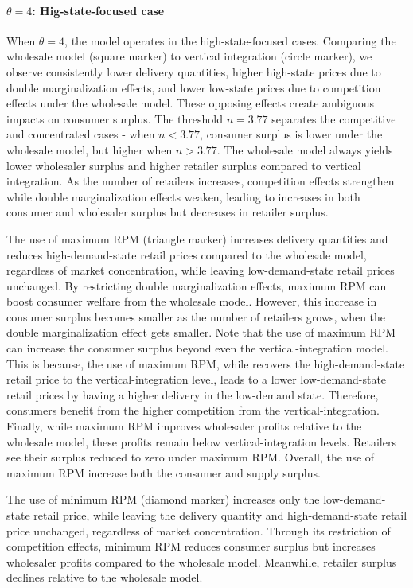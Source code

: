 \documentclass[12pt]{article}
\begin{document}
\paragraph{$\theta = 4$: Hig-state-focused case} When $\theta = 4$, the model operates in the high-state-focused cases. Comparing the wholesale model (square marker) to vertical integration (circle marker), we observe consistently lower delivery quantities, higher high-state prices due to double marginalization effects, and lower low-state prices due to competition effects under the wholesale model. These opposing effects create ambiguous impacts on consumer surplus. The threshold $n = 3.77$ separates the competitive and concentrated cases - when $n < 3.77$, consumer surplus is lower under the wholesale model, but higher when $n > 3.77$. The wholesale model always yields lower wholesaler surplus and higher retailer surplus compared to vertical integration. As the number of retailers increases, competition effects strengthen while double marginalization effects weaken, leading to increases in both consumer and wholesaler surplus but decreases in retailer surplus.

The use of maximum RPM (triangle marker) increases delivery quantities and reduces high-demand-state retail prices compared to the wholesale model, regardless of market concentration, while leaving low-demand-state retail prices unchanged. By restricting double marginalization effects, maximum RPM can boost consumer welfare from the wholesale model. However, this increase in consumer surplus becomes smaller as the number of retailers grows, when the double marginalization effect gets smaller. Note that the use of maximum RPM can increase the consumer surplus beyond even the vertical-integration model. This is  because, the use of maximum RPM, while recovers the high-demand-state retail price to the vertical-integration level, leads to a lower low-demand-state retail prices by having a higher delivery in the low-demand state. Therefore, consumers benefit from the higher competition from the vertical-integration.   Finally, while maximum RPM improves wholesaler profits relative to the wholesale model, these profits remain below vertical-integration levels. Retailers see their surplus reduced to zero under maximum RPM. Overall, the use of maximum RPM increase both the consumer and supply surplus.

The use of minimum RPM (diamond marker) increases only the low-demand-state retail price, while leaving the delivery quantity and high-demand-state retail price unchanged, regardless of market concentration. Through its restriction of competition effects, minimum RPM reduces consumer surplus but increases wholesaler profits compared to the wholesale model. Meanwhile, retailer surplus declines relative to the wholesale model.
\end{document}
